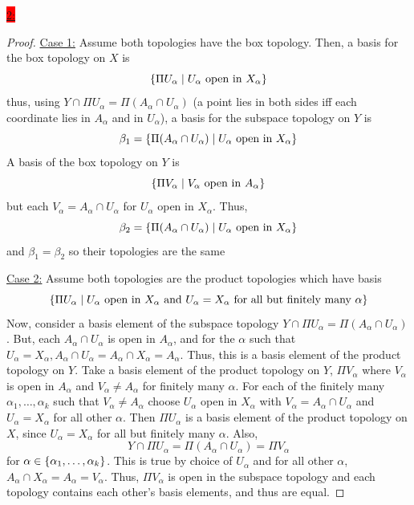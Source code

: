 \documentclass{exam}
\begin{document}
\colorbox{red}{\underline{2:}}
\begin{solution}
    \begin{proof}
        \underline{Case 1:} Assume both topologies have the box topology. Then, a basis for the box topology on $X$ is 
        \[
            \left\{\Pi U_\alpha \mid U_\alpha \text{ open in } X_\alpha \right\} 
        \]
        thus, using $Y \cap \Pi U_\alpha = \Pi(A_\alpha \cap U_\alpha)$ (a point lies in both sides iff each coordinate lies in $A_\alpha$ and in $U_\alpha$), a basis for the subspace topology on $Y$ is 
        \[
            \beta_{1} = \left\{\Pi(A_\alpha \cap U_\alpha) \mid U_\alpha \text{ open in } X_\alpha \right\}
        \]
        A basis of the box topology on $Y$ is 
        \[
            \left\{\Pi V_\alpha \mid V_\alpha \text{ open in } A_\alpha \right\} 
        \]
        but each $V_\alpha = A_\alpha \cap U_\alpha$ for $U_\alpha$ open in $X_\alpha$. Thus, 
        \[
            \beta_{2} = \left\{\Pi(A_\alpha \cap U_\alpha) \mid U_\alpha \text{ open in } X_\alpha \right\} 
        \]
        and $\beta_1 = \beta_2$ so their topologies are the same

        \underline{Case 2:} Assume both topologies are the product topologies which have basis 
        \[
            \left\{\Pi U_\alpha \mid U_\alpha \text{ open in $X_\alpha$ and $U_\alpha = X_\alpha$ for all but finitely many $\alpha$} \right\}
        \]
        Now, consider a basis element of the subspace topology $Y \cap \Pi U_\alpha = \Pi(A_\alpha \cap U_\alpha)$. But, each $A_\alpha \cap U_\alpha$ is open in $A_\alpha$, and for the $\alpha$ such that $U_\alpha = X_\alpha, A_\alpha \cap U_\alpha = A_\alpha \cap X_\alpha = A_\alpha$. Thus, this is a basis element of the product topology on $Y$. Take a basis element of the product topology on $Y$, $\Pi V_\alpha$ where $V_\alpha$ is open in $A_\alpha$ and $V_\alpha \neq A_\alpha$ for finitely many $\alpha$. For each of the finitely many $\alpha_1, \dots, \alpha_k$ such that $V_\alpha \neq A_\alpha$ choose $U_\alpha$ open in $X_\alpha$ with $V_\alpha = A_\alpha \cap U_\alpha$ and $U_\alpha = X_\alpha$ for all other $\alpha$. Then $\Pi U_\alpha$ is a basis element of the product topology on $X$, since $U_\alpha = X_\alpha$ for all but finitely many $\alpha$. Also, 
        \[
            Y \cap \Pi U_\alpha = \Pi (A_\alpha \cap U_\alpha)  = \Pi V_\alpha
        \] 
        for $\alpha \in \left\{\alpha_1, \dots, \alpha_k \right\}$. This is true by choice of $U_\alpha$ and for all other $\alpha$, $A_\alpha \cap X_\alpha = A_\alpha = V_\alpha$. Thus, $\Pi V_\alpha$ is open in the subspace topology and each topology contains each other's basis elements, and thus are equal.
    \end{proof}
\end{solution}
\end{document}
